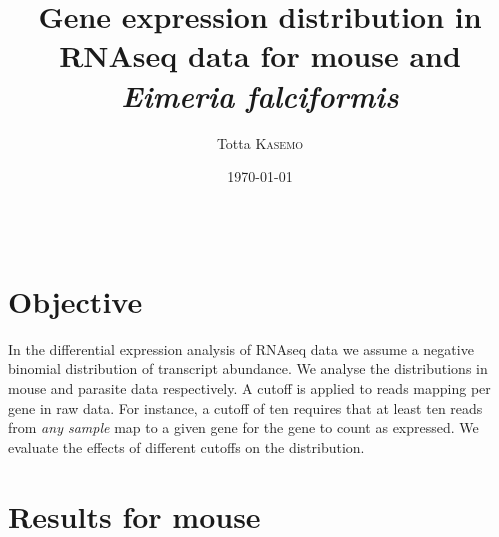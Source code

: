 \documentclass{article}
\title{Gene expression distribution in RNAseq data for mouse and \textit{Eimeria falciformis}} %
\author{Totta \textsc{Kasemo}} %
\date{\today} %
\begin{document}
\maketitle %

\begin{center}
\begin{tabular}{l r}
\end{tabular}
\end{center}



\section{Objective}

In the differential expression analysis of RNAseq data we assume a negative binomial distribution of transcript abundance. We analyse the distributions in mouse and parasite data respectively. A cutoff is applied to reads mapping per gene in raw data. For instance, a cutoff of ten requires that at least ten reads from \textit{any sample} map to a given gene for the gene to count as expressed. We evaluate the effects of different cutoffs on the distribution. 



\section{Results for mouse}
\end{document}
